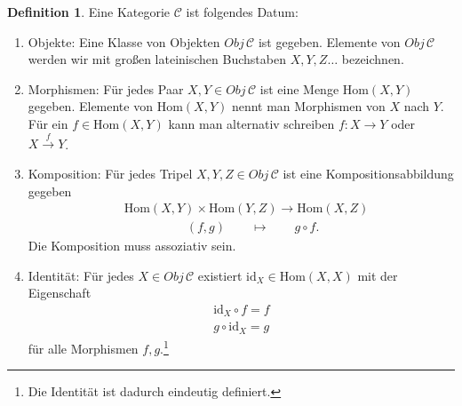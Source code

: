 \documentclass[reqno,12pt]{article}
\numberwithin{equation}{section}
\newcommand{\cC}{\mathcal{C}}
\newcommand{\id}{\text{id}}
\newcommand{\Hom}{\text{Hom}}
\theoremstyle{plain}
\theoremstyle{definition}
\newtheorem{definition}[thm]{Definition}
\begin{document}
\begin{definition}
Eine {\sf Kategorie} $\cC$ ist folgendes Datum:
\begin{enumerate}
  \item {\sf Objekte}: Eine Klasse von Objekten $Obj \, \cC$ ist gegeben. Elemente von $Obj \, \cC$ werden wir mit großen lateinischen Buchstaben $X,Y,Z \dots$ bezeichnen.

  \item {\sf Morphismen}: Für jedes Paar $X,Y \in Obj \, \cC$ ist eine Menge $\Hom(X,Y)$ gegeben. Elemente von $\Hom(X,Y)$ nennt man {\sf Morphismen} von $X$ nach $Y$. Für ein $f \in \Hom(X,Y)$ kann man alternativ schreiben $f \colon X \to Y$ oder $X \overset{f}{\to} Y$.

  \item {\sf Komposition}: Für jedes Tripel $X,Y,Z \in  Obj \, \cC$ ist eine Kompositionsabbildung gegeben
  \begin{align*}
  & \Hom(X,Y) \times \Hom(Y,Z) \to \Hom(X,Z) \\
  & \hspace{60pt} (f,g) \qquad  \mapsto \qquad g \circ f.
  \end{align*}
  Die Komposition muss assoziativ sein.

  \item {\sf Identität}: Für jedes $X \in Obj \, \cC$ existiert $\id_X \in \Hom(X,X)$ mit der Eigenschaft
  \begin{align*}
  \id_X \circ f = f  \\
  g \circ \id_X = g
  \end{align*}
  für alle Morphismen $f,g$.\footnote{Die Identität ist dadurch eindeutig definiert.}
\end{enumerate}
\end{definition}
\end{document}
